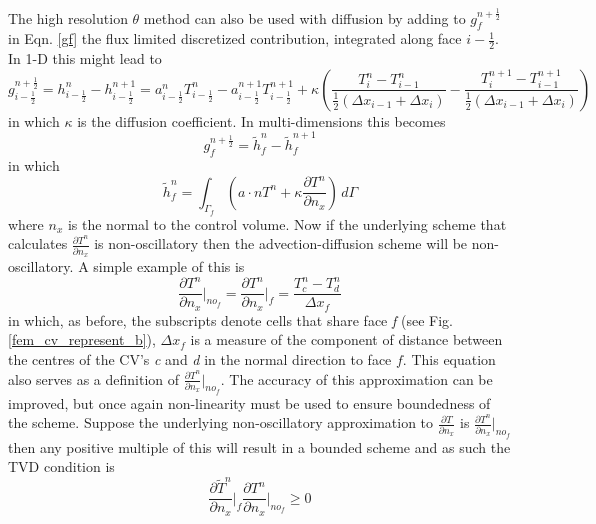 The high resolution $\theta$ method can also be used with diffusion by adding to $g_{f}^{n+\frac{1}{2}}$ in Eqn. \ref{gf} the flux limited discretized contribution, integrated along face $i-\frac{1}{2}$.
In 1-D this might lead to
\begin{displaymath}
g_{i-\frac{1}{2}}^{n+\frac{1}{2}} = h_{i-\frac{1}{2}}^n-h_{i-\frac{1}{2}}^{n+1}
= a_{i-\frac{1}{2}}^n T_{i-\frac{1}{2}}^n -
a_{i-\frac{1}{2}}^{n+1} T_{i-\frac{1}{2}}^{n+1} + \kappa \left(
\frac{T_{i}^n-T_{i-1}^n}{\frac{1}{2}(\Delta x_{i-1}+\Delta x_i )}
- \frac{T_{i}^{n+1}-T_{i-1}^{n+1}}{\frac{1}{2}(\Delta
x_{i-1}+\Delta x_i )}\right)
\end{displaymath}
in which $\kappa$ is the diffusion coefficient. In multi-dimensions this becomes
\begin{displaymath}
g_{f}^{n+\frac{1}{2}} = \tilde h_{f}^n-\tilde h_{f}^{n+1}
\end{displaymath}
in which
\begin{equation}
\tilde{h}_{f}^{n} = \int_{\Gamma_f} \left( a \cdot n T^{n}
+ \kappa \frac{\partial T^n}{\partial n_x} \right) \,d\Gamma
\label{16a}
\end{equation}
where $n_x$ is the normal to the control volume. Now if the underlying scheme that calculates $\frac{\partial T^n}{\partial n_x}$ is non-oscillatory then the advection-diffusion scheme will be non-oscillatory. A simple example of this is
\begin{displaymath}
\frac{\partial T^n}{\partial n_x}\Big\vert_{no_f} = \frac{\partial T^n}{\partial n_x} \Big\vert_{f} = \frac{T_{c}^{n} - T_{d}^{n}}{\Delta x_{f}}
\end{displaymath}
in which, as before, the subscripts denote cells that share face \textit{f} (see Fig. \ref{fem_cv_represent_b}), $\Delta x_{f}$ is a measure of the component of distance between the centres of the CV's \textit{c} and \textit{d} in the normal direction to face $f$. This equation also serves as a definition of $\frac{\partial T^{n}}{\partial n_x}\vert_{no_f}$. The accuracy of this approximation can be improved, but once again non-linearity must be used to ensure boundedness of the scheme. Suppose the underlying non-oscillatory approximation to $\frac{\partial T}{\partial n_x}$ is $\frac{\partial T^n}{\partial n_x}\vert_{no_f}$ then any positive multiple of this will result in a bounded scheme and as such the TVD condition is
\begin{displaymath}
{\frac{\partial \widetilde{T}^{n}}{\partial n_x}\Big\vert_{f}
\frac{\partial T^{n}}{\partial n_x}\Big\vert_{no_f}} \geq 0
\end{displaymath}
